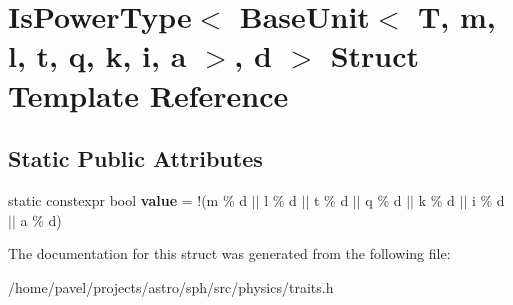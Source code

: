 \hypertarget{structIsPowerType_3_01BaseUnit_3_01T_00_01m_00_01l_00_01t_00_01q_00_01k_00_01i_00_01a_01_4_00_01d_01_4}{}\section{Is\+Power\+Type$<$ Base\+Unit$<$ T, m, l, t, q, k, i, a $>$, d $>$ Struct Template Reference}
\label{structIsPowerType_3_01BaseUnit_3_01T_00_01m_00_01l_00_01t_00_01q_00_01k_00_01i_00_01a_01_4_00_01d_01_4}
\subsection*{Static Public Attributes}
\begin{DoxyCompactItemize}
\item 
\hypertarget{structIsPowerType_3_01BaseUnit_3_01T_00_01m_00_01l_00_01t_00_01q_00_01k_00_01i_00_01a_01_4_00_01d_01_4_a600296a53feed0746ef6ec2ccda0a38e}{}\label{structIsPowerType_3_01BaseUnit_3_01T_00_01m_00_01l_00_01t_00_01q_00_01k_00_01i_00_01a_01_4_00_01d_01_4_a600296a53feed0746ef6ec2ccda0a38e} 
static constexpr bool {\bfseries value} = !(m \% d $\vert$$\vert$ l \% d $\vert$$\vert$ t \% d $\vert$$\vert$ q \% d $\vert$$\vert$ k \% d $\vert$$\vert$ i \% d $\vert$$\vert$ a \% d)
\end{DoxyCompactItemize}


The documentation for this struct was generated from the following file\+:\begin{DoxyCompactItemize}
\item 
/home/pavel/projects/astro/sph/src/physics/traits.\+h\end{DoxyCompactItemize}
